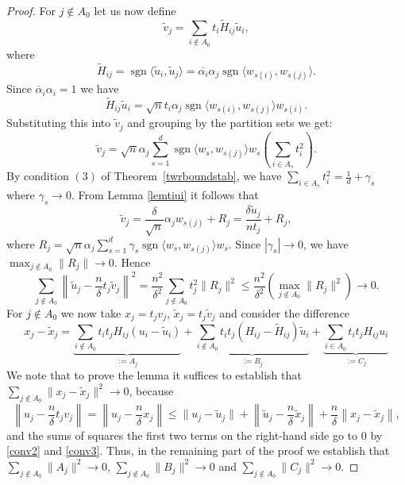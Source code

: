 \documentclass[12pt, reqno]{amsart}
\theoremstyle{definition}
\theoremstyle{remark}
\numberwithin{equation}{section}
\DeclareMathOperator{\sgn}{sgn}
\begin{document}
\begin{proof}
For $j \not \in A_0$ let us now define 
$$\widetilde{v}_j = \sum_{i \notin A_0} t_i \widetilde{H}_{ij} \widetilde{u}_i,$$
where 
$$\widetilde{H}_{ij} = \sgn\langle \widetilde{u}_i, \widetilde{u}_j \rangle = \overline{\alpha_i} \alpha_j \sgn \langle w_{s(i)}, w_{s(j)} \rangle.$$
Since $\overline{\alpha}_i \alpha_i = 1$ we have
$$\widetilde{H}_{ij} \widetilde{u}_i = \sqrt{n} t_i \alpha_j  \sgn \langle w_{s(i)}, w_{s(j)} \rangle w_{s(i)}.$$
Substituting this into $\widetilde{v}_j$ and grouping by the partition sets we get:
$$\widetilde{v}_j = \sqrt{n} \alpha_j \sum_{s=1}^d \sgn \langle w_{s}, w_{s(j)} \rangle w_s \left( \sum_{i \in A_s} t_i^2 \right).$$
By condition $(3)$ of Theorem~\ref{twrboundstab}, we have $\sum_{i \in A_s} t_i^2 = \frac{1}{d} + \gamma_s$ where $\gamma_s \to 0$. From Lemma \ref{lemtiui} it follows that
$$\widetilde{v}_j = \frac{\delta}{\sqrt{n}} \alpha_j w_{s(j)} + R_j = \frac{ \delta \widetilde{u}_j}{n t_j} + R_j,$$
where $R_j = \sqrt{n} \alpha_j \sum_{s=1}^d \gamma_s \sgn \langle w_{s}, w_{s(j)} \rangle w_s$. Since $|\gamma_s| \to 0$, we have $\max_{j \notin A_0} \|R_j\| \to 0$.
Hence
\begin{equation}
\label{conv3}
\sum_{j \notin A_0} \left \| \widetilde{u}_j - \frac{n}{\delta}t_j \widetilde{v}_j \right \|^2 = \frac{n^2}{\delta^2} \sum_{j \notin A_0} t_j^2 \|R_j\|^2 \le \frac{n^2}{\delta^2}\left( \max_{j \notin A_0} \|R_j\|^2 \right) \to 0.
\end{equation}
For $j \notin A_0$ we now take $x_j = t_j v_j$, $\widetilde{x}_j = t_j \widetilde{v}_j$ and consider the difference
$$x_j - \widetilde{x}_j = \underbrace{\sum_{i \notin A_0} t_i t_j H_{ij} (u_i - \widetilde{u}_i)}_{:= A_j} + \underbrace{\sum_{i \notin A_0} t_i t_j (H_{ij} - \widetilde{H}_{ij}) \widetilde{u}_i}_{:= B_j} + \underbrace{\sum_{i \in A_0} t_i t_j H_{ij}u_i}_{:= C_j}$$
We note that to prove the lemma it suffices to establish that $\sum_{j \notin A_0} \|x_j-\widetilde{x}_j\|^2 \to 0$, because
$$ \left \|u_j - \frac{n}{\delta} t_j v_j \right \| = \left \|u_j - \frac{n}{\delta} x_j \right \| \leq \|u_j - \widetilde{u}_j \| + \left \| \widetilde{u}_j - \frac{n}{\delta} \widetilde{x}_j \right \| + \frac{n}{\delta}\left \|x_j-\widetilde{x}_j \right \|, $$
and the sums of squares the first two terms on the right-hand side go to $0$ by \eqref{conv2} and \eqref{conv3}. Thus, in the remaining part of the proof we establish that $\sum_{j \notin A_0} \|A_j\|^2 \to 0$, $\sum_{j \notin A_0} \|B_j\|^2 \to 0$ and $\sum_{j \notin A_0} \|C_j\|^2 \to 0$.


\end{proof}
\end{document}
